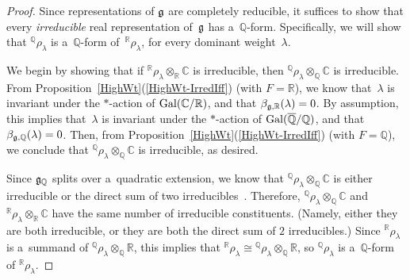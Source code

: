 \begin{proof}
Since representations of $\Lie G$ are completely reducible, it suf\/f\/ices to show that every \emph{irreducible} real
representation of~$\Lie G$ has a~$\mathbb{Q}$-form.
Specif\/ically, we will show that ${}^\mathbb{Q} \rho_\lambda$ is a~$\mathbb{Q}$-form of~${}^\mathbb{R} \rho_\lambda$, for
every dominant weight~$\lambda$.

We begin by showing that if ${}^\mathbb{R} \rho_\lambda \otimes_\mathbb{R} \mathbb{C}$ is irreducible, then
${}^\mathbb{Q} \rho_\lambda \otimes_\mathbb{Q} \mathbb{C}$ is irreducible.
From Proposition~\ref{HighWt}(\ref{HighWt-IrredIff}) (with $F = \mathbb{R}$), we know that~$\lambda$ is invariant under the $*$-action
of $\operatorname{Gal}(\mathbb{C}/\mathbb{R})$, and that $\beta_{\Lie G,\mathbb{R}}(\lambda) = 0$.
By assumption, this implies that~$\lambda$ is invariant under the $*$-action of\/
$\operatorname{Gal}(\overline{\mathbb{Q}}/\mathbb{Q})$, and that $\beta_{\Lie G,\mathbb{Q}}(\lambda) = 0$.
Then, from Proposition~\ref{HighWt}(\ref{HighWt-IrredIff}) (with $F = \mathbb{Q}$), we conclude that ${}^\mathbb{Q} \rho_\lambda
\otimes_\mathbb{Q} \mathbb{C}$ is irreducible, as desired.

Since $\Lie G_\mathbb{Q}$ splits over a~quadratic extension, we know that ${}^\mathbb{Q} \rho_\lambda \otimes_\mathbb{Q}
\mathbb{C}$ is either irreducible or the direct sum of two irreducibles~\cite[Corollary~3.2(2)]{Morris-RRepsQForms}.
Therefore, ${}^\mathbb{Q} \rho_\lambda \otimes_\mathbb{Q} \mathbb{C}$ and ${}^\mathbb{R} \rho_\lambda \otimes_\mathbb{R}
\mathbb{C}$ have the same number of irreducible constituents.
(Namely, either they are both irreducible, or they are both the direct sum of $2$ irreducibles.) Since ${}^\mathbb{R}
\rho_\lambda$ is a~summand of ${}^\mathbb{Q} \rho_\lambda \otimes_\mathbb{Q} \mathbb{R}$, this implies that
${}^\mathbb{R} \rho_\lambda \cong {}^\mathbb{Q} \rho_\lambda \otimes_\mathbb{Q} \mathbb{R}$, so ${}^\mathbb{Q}
\rho_\lambda$ is a~$\mathbb{Q}$-form of ${}^\mathbb{R} \rho_\lambda$.
\end{proof}

